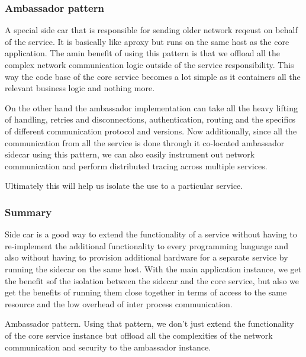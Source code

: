 \documentclass[a4paper, 11pt]{book}
\begin{document}
    \subsubsection{Ambassador pattern}
    A special side car that is responsible for sending older network reqeust on behalf of the service.
    It is basically like aproxy but runs on the same host as the core application.
    The amin benefit of using this pattern is that we offload all the complex network communication logic outside of the service responsibility.
    This way the code base of the core service becomes a lot simple as it containers all the relevant business logic and nothing more.

    On the other hand the ambassador implementation can take all the heavy lifting of handling, retries and disconnections, authentication, routing and the specifics of different communication protocol and versions.
    Now additionally, since all the communication from all the service is done through it co-located ambassador sidecar using this pattern, we can also easily instrument out network communication and perform distributed tracing across multiple services.

    Ultimately this will help us isolate the use to a particular service.

    \subsubsection{Summary}
    Side car is a good way to extend the functionality of a service without having to re-implement the additional functionality to every programming language and also without having to provision additional hardware for a separate service by running the sidecar on the same host.
    With the main application instance, we get the benefit sof the isolation between the sidecar and the core service, but also we get the benefits of running them close together in terms of access to the same resource and the low overhead of inter process communication.

    Ambassador pattern.
    Using that pattern, we don't just extend the functionality of the core service instance but offload all the complexities of the network communication and security to the ambassador instance.
\end{document}
